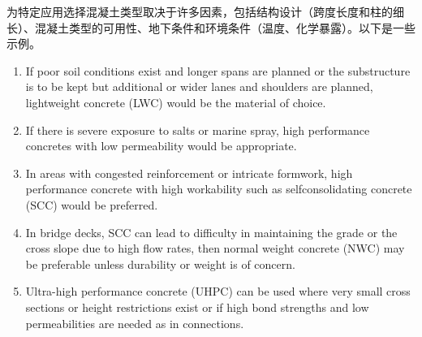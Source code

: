 为特定应用选择混凝土类型取决于许多因素，包括结构设计（跨度长度和柱的细长）、混凝土类型的可用性、地下条件和环境条件（温度、化学暴露）。以下是一些示例。
\begin{enumerate}
  \item If poor soil conditions exist and longer spans are planned or the substructure is to be kept but additional or wider lanes and shoulders are planned, lightweight concrete (LWC) would be the material of choice.
  \item If there is severe exposure to salts or marine spray, high performance concretes with low permeability would be appropriate.
  \item In areas with congested reinforcement or intricate formwork, high performance concrete with high workability such as selfconsolidating  concrete (SCC) would be preferred. 
  \item In bridge decks, SCC can lead to difficulty in maintaining the grade or the cross slope due to high flow rates, then normal weight concrete (NWC) may be preferable unless durability or weight is of concern.
  \item Ultra-high performance concrete (UHPC) can be used where very small cross sections or height restrictions exist or if high bond strengths and low permeabilities are needed as in connections.
\end{enumerate}


